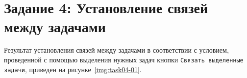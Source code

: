\section{Задание 4: Установление связей между задачами}

Результат установления связей между задачами в соответствии с условием,
проведенной с помощью выделения нужных задач кнопки \texttt{Связать выделенные
задачи}, приведен на рисунке~\ref{img:task04-01}.

